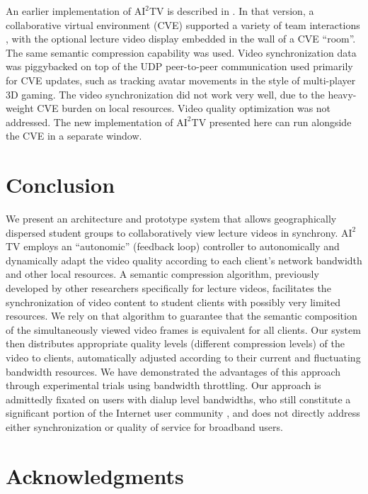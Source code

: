 \documentclass{sig-alternate}
\begin{document}
An earlier implementation of $\mathrm{AI}^2$TV is described in
\cite{VECTORS}.  In that version, a collaborative virtual environment
(CVE) supported a variety of team interactions \cite{CHIME}, with the
optional lecture video display embedded in the wall of a CVE ``room''.
The same semantic compression capability was used. Video
synchronization data was piggybacked on top of the UDP peer-to-peer
communication used primarily for CVE updates, such as tracking avatar
movements in the style of multi-player 3D gaming.  The video
synchronization did not work very well, due to the heavy-weight CVE
burden on local resources. Video quality optimization was not
addressed.  The new implementation of $\mathrm{AI}^2$TV presented here
can run alongside the CVE in a separate window.

\section{Conclusion}

We present an architecture and prototype system that allows
geographically dispersed student groups to collaboratively view
lecture videos in synchrony. $\mathrm{AI}^2$TV employs an
``autonomic'' (feedback loop) controller to autonomically and
dynamically adapt the video quality according to each client's network
bandwidth and other local resources.  A semantic compression
algorithm, previously developed by other researchers specifically for
lecture videos, facilitates the synchronization of video content to
student clients with possibly very limited resources.  We rely on that
algorithm to guarantee that the semantic composition of the
simultaneously viewed video frames is equivalent for all clients.  Our
system then distributes appropriate quality levels (different
compression levels) of the video to clients, automatically adjusted
according to their current and fluctuating bandwidth resources.  We
have demonstrated the advantages of this approach through experimental
trials using bandwidth throttling.  Our approach is admittedly fixated
on users with dialup level bandwidths, who still constitute a
significant portion of the Internet user community \cite{dialup}, and
does not directly address either synchronization or quality of service
for broadband users.

\section{Acknowledgments}
\end{document}
